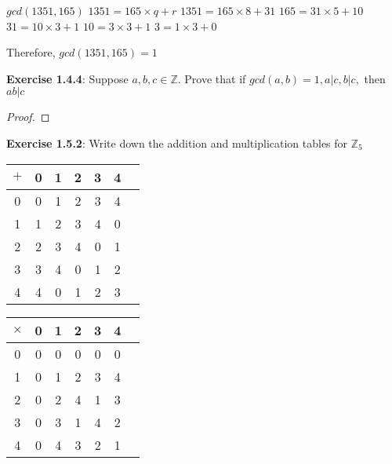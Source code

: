 \documentclass[a4paper]{article}
\begin{document}
\begin{myparindent}{0pt}
$gcd(1351, 165)$ \newline
$1351 = 165 \times q + r$ \newline
$1351 = 165 \times 8 + 31$ \newline
$165 = 31 \times 5 + 10$ \newline
$31 = 10 \times 3 + 1$ \newline
$10 = 3 \times 3 + 1$ \newline
$3 = 1 \times 3 + 0$ \newline

Therefore, $gcd(1351, 165) = 1$ \newline
\newline

\textbf{Exercise 1.4.4}:
Suppose $a, b, c \in \mathbb{Z}$. Prove that if $gcd(a, b) = 1, a|c, b|c,$ then $ab|c$
\begin{proof}
\end{proof}

\textbf{Exercise 1.5.2}:
Write down the addition and multiplication tables for $\mathbb{Z}_5$ \newline

\begin{center}
\begin{tabular}{ c| c | c | c | c | c | c |}
$+$ & 0 & 1 & 2 & 3 & 4 \\
\hline
0 & 0 & 1 & 2 & 3 & 4 \\
\hline
1 & 1 & 2 & 3 & 4 & 0 \\
\hline
2 & 2 & 3 & 4 & 0 & 1 \\
\hline
3 & 3 & 4 & 0 & 1 & 2 \\
\hline
4 & 4 & 0 & 1 & 2 & 3 \\
\hline
\end{tabular}
\end{center}

\begin{center}
\begin{tabular}{ c| c | c | c | c | c | c |}
$\times$ & 0 & 1 & 2 & 3 & 4 \\
\hline
0 & 0 & 0 & 0 & 0 & 0 \\
\hline
1 & 0 & 1 & 2 & 3 & 4 \\
\hline
2 & 0 & 2 & 4 & 1 & 3 \\
\hline
3 & 0 & 3 & 1 & 4 & 2 \\
\hline
4 & 0 & 4 & 3 & 2 & 1 \\
\hline
\end{tabular}
\end{center}


\end{myparindent}
\end{document}
